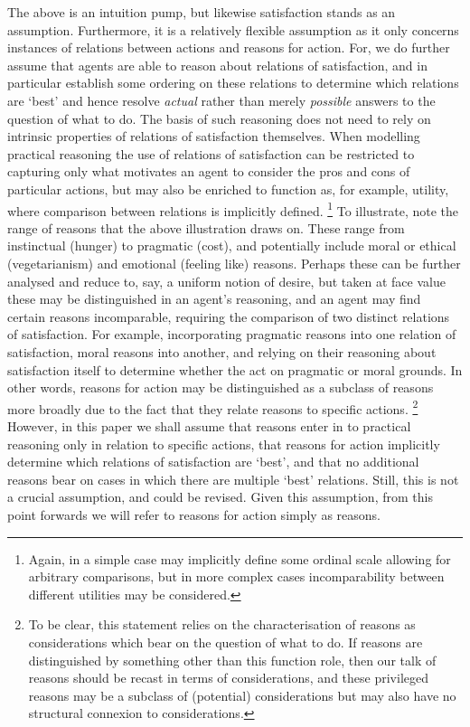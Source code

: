 \documentclass[10pt]{article}
\begin{document}
The above is an intuition pump, but likewise satisfaction stands as an assumption.
Furthermore, it is a relatively flexible assumption as it only concerns instances of relations between actions and reasons for action.
For, we do further assume that agents are able to reason about relations of satisfaction, and in particular establish some ordering on these relations to determine which relations are `best' and hence resolve \emph{actual} rather than merely \emph{possible} answers to the question of what to do.
The basis of such reasoning does not need to rely on intrinsic properties of relations of satisfaction themselves.
When modelling practical reasoning the use of relations of satisfaction can be restricted to capturing only what motivates an agent to consider the pros and cons of particular actions, but may also be enriched to function as, for example, utility, where comparison between relations is implicitly defined.\nolinebreak
\footnote{Again, in a simple case may implicitly define some ordinal scale allowing for arbitrary comparisons, but in more complex cases incomparability between different utilities may be considered.}
To illustrate, note the range of reasons that the above illustration draws on.
These range from instinctual (hunger) to pragmatic (cost), and potentially include moral or ethical (vegetarianism) and emotional (feeling like) reasons.
Perhaps these can be further analysed and reduce to, say, a uniform notion of desire, but taken at face value these may be distinguished in an agent's reasoning, and an agent may find certain reasons incomparable, requiring the comparison of two distinct relations of satisfaction.
For example, incorporating pragmatic reasons into one relation of satisfaction, moral reasons into another, and relying on their reasoning about satisfaction itself to determine whether the act on pragmatic or moral grounds.
In other words, reasons for action may be distinguished as a subclass of reasons more broadly due to the fact that they relate reasons to specific actions.\nolinebreak
\footnote{To be clear, this statement relies on the characterisation of reasons as considerations which bear on the question of what to do.
  If reasons are distinguished by something other than this function role, then our talk of reasons should be recast in terms of considerations, and these privileged reasons may be a subclass of (potential) considerations but may also have no structural connexion to considerations.}
However, in this paper we shall assume that reasons enter in to practical reasoning only in relation to specific actions, that reasons for action implicitly determine which relations of satisfaction are `best', and that no additional reasons bear on cases in which there are multiple `best' relations.
Still, this is not a crucial assumption, and could be revised.
Given this assumption, from this point forwards we will refer to reasons for action simply as reasons.
\end{document}
